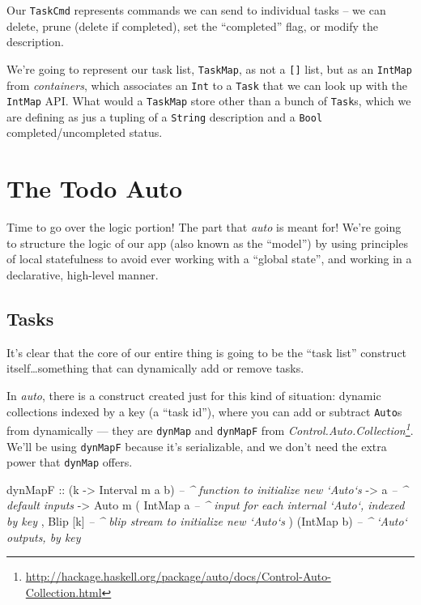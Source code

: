 \documentclass[]{article}
\newenvironment{Shaded}{}{}
\newcommand{\DataTypeTok}[1]{\textcolor[rgb]{0.56,0.13,0.00}{{#1}}}
\newcommand{\CommentTok}[1]{\textcolor[rgb]{0.38,0.63,0.69}{\textit{{#1}}}}
\newcommand{\OtherTok}[1]{\textcolor[rgb]{0.00,0.44,0.13}{{#1}}}
\newcommand{\NormalTok}[1]{{#1}}
\renewcommand{\href}[2]{#2\footnote{\url{#1}}}
\begin{document}
Our \texttt{TaskCmd} represents commands we can send to individual tasks
-- we can delete, prune (delete if completed), set the ``completed''
flag, or modify the description.

We're going to represent our task list, \texttt{TaskMap}, as not a
\texttt{{[}{]}} list, but as an \texttt{IntMap} from \emph{containers},
which associates an \texttt{Int} to a \texttt{Task} that we can look up
with the \texttt{IntMap} API. What would a \texttt{TaskMap} store other
than a bunch of \texttt{Task}s, which we are defining as jus a tupling
of a \texttt{String} description and a \texttt{Bool}
completed/uncompleted status.

\section{The Todo Auto}\label{the-todo-auto}

Time to go over the logic portion! The part that \emph{auto} is meant
for! We're going to structure the logic of our app (also known as the
``model'') by using principles of local statefulness to avoid ever
working with a ``global state'', and working in a declarative,
high-level manner.

\subsection{Tasks}\label{tasks}

It's clear that the core of our entire thing is going to be the ``task
list'' construct itself\ldots{}something that can dynamically add or
remove tasks.

In \emph{auto}, there is a construct created just for this kind of
situation: dynamic collections indexed by a key (a ``task id''), where
you can add or subtract \texttt{Auto}s from dynamically --- they are
\texttt{dynMap} and \texttt{dynMapF} from
\emph{\href{http://hackage.haskell.org/package/auto/docs/Control-Auto-Collection.html}{Control.Auto.Collection}}.
We'll be using \texttt{dynMapF} because it's serializable, and we don't
need the extra power that \texttt{dynMap} offers.

\begin{Shaded}
\begin{Highlighting}[]
\OtherTok{dynMapF ::} \NormalTok{(k }\OtherTok{->} \DataTypeTok{Interval} \NormalTok{m a b)    }\CommentTok{-- ^ function to initialize new `Auto`s}
        \OtherTok{->} \NormalTok{a                        }\CommentTok{-- ^ default inputs}
        \OtherTok{->} \DataTypeTok{Auto} \NormalTok{m ( }\DataTypeTok{IntMap} \NormalTok{a        }\CommentTok{-- ^ input for each internal `Auto`, indexed by key}
                  \NormalTok{, }\DataTypeTok{Blip} \NormalTok{[k]        }\CommentTok{-- ^ blip stream to initialize new `Auto`s}
                  \NormalTok{)}
                  \NormalTok{(}\DataTypeTok{IntMap} \NormalTok{b)        }\CommentTok{-- ^ `Auto` outputs, by key}
\end{Highlighting}
\end{Shaded}
\end{document}
